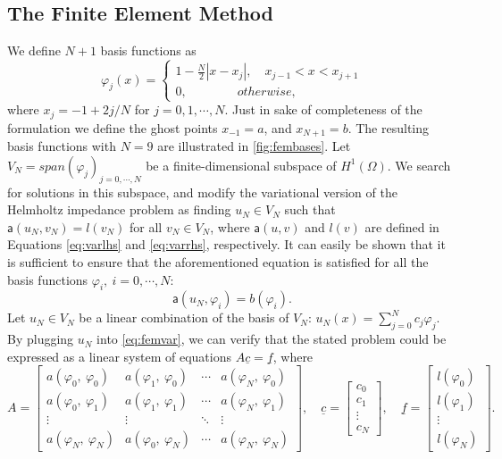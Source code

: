 \subsection{The Finite Element Method}\label{sec:femframework}
We define $N+1$ basis functions as
\begin{equation}
    \label{eq:fembasisfuncs}
    \varphi_j(x) = \left\{\begin{matrix}
        1 - \frac{N}{2}|x - x_j|, \quad x_{j-1} < x < x_{j+1}
        \\
        0, \qquad \qquad otherwise,
        \end{matrix}\right.
\end{equation}
where $x_j = -1 + 2j/N$ for $j = 0, 1, \cdots, N$. Just in sake of completeness of the formulation we define the ghost points $x_{-1} = a$, and $x_{N+1} = b$. The resulting basis functions with $N=9$ are illustrated in \autoref{fig:fembases}. Let $V_N = span(\varphi_j)_{j=0, \cdots, N}$ be a finite-dimensional subspace of $H^{1}(\Omega)$. We search for solutions in this subspace, and modify the variational version of the Helmholtz impedance problem as finding $u_N \in V_N$ such that $\mathsf{a}(u_N,v_N) = l(v_N)$ for all $v_N \in V_N$, where $\mathsf{a}(u,v)$ and $l(v)$ are defined in Equations \eqref{eq:varlhs} and \eqref{eq:varrhs}, respectively. It can easily be shown that it is sufficient to ensure that the aforementioned equation is satisfied for all the basis functions $\varphi_i,\:i=0, \cdots, N$:
\begin{equation}
    \label{eq:femvar}
    \mathsf{a}(u_N,\varphi_i) = b(\varphi_i).
\end{equation}
Let $u_N \in V_N$ be a linear combination of the basis of $V_N$: $u_N(x) = \sum_{j=0}^{N}{c_j\varphi_j}$. By plugging $u_N$ into \eqref{eq:femvar}, we can verify that the stated problem could be expressed as a linear system of equations $A\underline{c}=\underline{f}$, where
\begin{equation}
    \label{eq:femcoeffs}
    A = \begin{bmatrix}
        a(\varphi_0,\:\varphi_0) & a(\varphi_1,\:\varphi_0) & \cdots & a(\varphi_N,\:\varphi_0) \\
        a(\varphi_0,\:\varphi_1) & a(\varphi_1,\:\varphi_1) & \cdots & a(\varphi_N,\:\varphi_1) \\
        \vdots & \vdots & \ddots & \vdots \\
        a(\varphi_N,\:\varphi_N) & a(\varphi_0,\:\varphi_N) & \cdots & a(\varphi_N,\:\varphi_N)
        \end{bmatrix},
        \quad
        \underline{c} = \begin{bmatrix}
        c_0\\
        c_1\\
        \vdots\\
        c_N
        \end{bmatrix},
        \quad
        \underline{f} = \begin{bmatrix}
        l(\varphi_0)\\
        l(\varphi_1)\\
        \vdots\\
        l(\varphi_N)
        \end{bmatrix}.
\end{equation}
